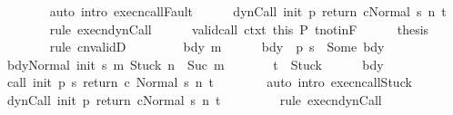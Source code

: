 \begin{isabellebody}
\ \ \ \ \ \ \isamarkupfalse%
\ {\isacharparenleft}auto\ intro{\isacharcolon}\ execn{\isacharunderscore}callFault{\isacharparenright}\isanewline
\ \ \ \ \isamarkupfalse%
\ {\isachardoublequoteopen}{\isasymGamma}{\isasymturnstile}{\isasymlangle}dynCall\ init\ p\ return{\isacharprime}\ c{\isacharcomma}Normal\ s{\isasymrangle}\ {\isacharequal}n{\isasymRightarrow}\ t{\isachardoublequoteclose}\ \isanewline
\ \ \ \ \ \ \isamarkupfalse%
\ {\isacharparenleft}rule\ execn{\isacharunderscore}dynCall{\isacharparenright}\isanewline
\ \ \ \ \isamarkupfalse%
\ valid{\isacharunderscore}call\ ctxt\ this\ P\ t{\isacharunderscore}notin{\isacharunderscore}F\isanewline
\ \ \ \ \isamarkupfalse%
\ {\isacharquery}thesis\isanewline
\ \ \ \ \ \ \isamarkupfalse%
\ {\isacharparenleft}rule\ cnvalidD{\isacharparenright}\isanewline
\ \ \isamarkupfalse%
\isanewline
\ \ \ \ \isamarkupfalse%
\ bdy\ m\isanewline
\ \ \ \ \isamarkupfalse%
\ bdy{\isacharcolon}\ {\isachardoublequoteopen}{\isasymGamma}\ {\isacharparenleft}p\ s{\isacharparenright}\ {\isacharequal}\ Some\ bdy{\isachardoublequoteclose}\isanewline
\ \ \ \ \isamarkupfalse%
\ {\isachardoublequoteopen}{\isasymGamma}{\isasymturnstile}{\isasymlangle}bdy{\isacharcomma}Normal\ {\isacharparenleft}init\ s{\isacharparenright}{\isasymrangle}\ {\isacharequal}m{\isasymRightarrow}\ Stuck{\isachardoublequoteclose}\ {\isachardoublequoteopen}n\ {\isacharequal}\ Suc\ m{\isachardoublequoteclose}\ \isanewline
\ \ \ \ \ \ {\isachardoublequoteopen}t\ {\isacharequal}\ Stuck{\isachardoublequoteclose}\isanewline
\ \ \ \ \isamarkupfalse%
\ bdy\ \isamarkupfalse%
\ {\isachardoublequoteopen}{\isasymGamma}{\isasymturnstile}{\isasymlangle}call\ init\ {\isacharparenleft}p\ s{\isacharparenright}\ return{\isacharprime}\ c\ {\isacharcomma}Normal\ s{\isasymrangle}\ {\isacharequal}n{\isasymRightarrow}\ t{\isachardoublequoteclose}\isanewline
\ \ \ \ \ \ \isamarkupfalse%
\ {\isacharparenleft}auto\ intro{\isacharcolon}\ execn{\isacharunderscore}callStuck{\isacharparenright}\isanewline
\ \ \ \ \isamarkupfalse%
\ {\isachardoublequoteopen}{\isasymGamma}{\isasymturnstile}{\isasymlangle}dynCall\ init\ p\ return{\isacharprime}\ c{\isacharcomma}Normal\ s{\isasymrangle}\ {\isacharequal}n{\isasymRightarrow}\ t{\isachardoublequoteclose}\ \isanewline
\ \ \ \ \ \ \isamarkupfalse%
\ {\isacharparenleft}rule\ execn{\isacharunderscore}dynCall{\isacharparenright}\isanewline

\end{isabellebody}
